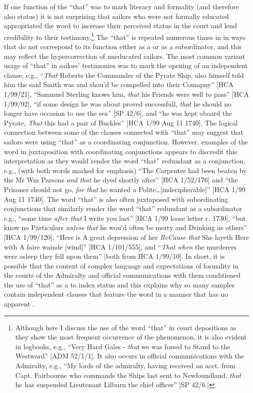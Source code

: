 If one function of the  “that” was to mark literacy and formality (and therefore also status) it is not surprising that sailors who were not formally educated appropriated the word to increase their perceived status in the court and lend credibility to their testimony.\footnote{Although here I discuss the use of the word “that” in court depositions as they show the most frequent occurrence of the phenomenon, it is also evident in logbooks, e.g., “Very Hard Gales - \textit{that} we was forsed to Stand to the Westward” [ADM 52/1/1]. It also occurs in official communications with the Admiralty, e.g., “My lords of the admiralty, having received an acct. from Capt. Fairbourne who commands the Ships last sent to Newfoundland, \textit{that} he has suspended Lieutenant Lilburn the chief officer” [SP 42/6.]}   The  “that” is repeated numerous times in  in ways that do not correspond to its function either as a  or as a subordinator, and this may reflect the hypercorrection of uneducated sailors. The most common variant usage of “that” in sailors’ testimonies was to mark the opening of an independent clause, e.g., “\textit{That} Roberts the Commander of the Pyrate Ship, also himself told him the said Smith was and shou’d be compelled into their Comapny” [HCA 1/99/21], “Sammuel Sterling knows him, \textit{that} his Friends were well to pass” [HCA 1/99/92], “if some design he was about proved successfull, \textit{that} he should no longer have occasion to use the sea” [SP 42/6], and “he was kept aboard the Pyrate, \textit{That} this  had a pair of Buckles” [HCA 1/99  Aug 11 1740]. The logical connection between some of the clauses connected with “that” may suggest that sailors were using “that” as a coordinating conjunction. However, examples of the word in juxtaposition with coordinating conjunctions appears to discredit this interpretation as they would render the word “that” redundant as a conjunction, e.g., (with both words marked for emphasis) “The Carpenter had been beaten by the Mr Wm Parsons \textit{and that} he dyed shortly after” [HCA 1/52/176] and “the Prisoner should not go, \textit{for that} he wanted a Polite…[indecipherable]” [HCA 1/99  Aug 11 1740]. The word “that” is also often juxtaposed with subordinating conjunctions that similarly render the word “that” redundant as a subordinator e.g., “some time \textit{after that} I write you last” [HCA 1/99 loose letter c. 1730], “but know no Particulars \textit{unless that} he wou’d often be merry and Drinking as others” [HCA 1/99/120], “Here is A great depression of her \textit{BeCause that} She layeth Here with A faire wainde [wind]” [HCA 1/101/555], and “\textit{That when} the murderers were asleep they fell upon them” [both from HCA 1/99/10]. In short, it is possible that the context of complex language and expectations of formality in the courts of the Admiralty and official communications with them conditioned the use of “that” as a  to index status and this explains why so many samples contain independent clauses that feature the word in a manner that has no apparent .

